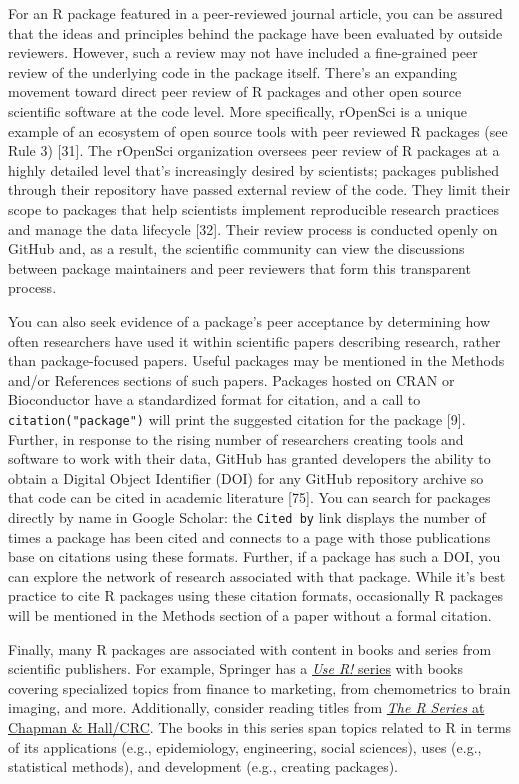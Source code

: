 \documentclass[10pt,letterpaper]{article}
\begin{document}
For an R package featured in a peer-reviewed journal article, you can be
assured that the ideas and principles behind the package have been
evaluated by outside reviewers. However, such a review may not have
included a fine-grained peer review of the underlying code in the
package itself. There's an expanding movement toward direct peer review
of R packages and other open source scientific software at the code
level. More specifically, rOpenSci is a unique example of an ecosystem
of open source tools with peer reviewed R packages (see Rule 3)
{[}31{]}. The rOpenSci organization oversees peer review of R packages
at a highly detailed level that's increasingly desired by scientists;
packages published through their repository have passed external review
of the code. They limit their scope to packages that help scientists
implement reproducible research practices and manage the data lifecycle
{[}32{]}. Their review process is conducted openly on GitHub and, as a
result, the scientific community can view the discussions between
package maintainers and peer reviewers that form this transparent
process.

You can also seek evidence of a package's peer acceptance by determining
how often researchers have used it within scientific papers describing
research, rather than package-focused papers. Useful packages may be
mentioned in the Methods and/or References sections of such papers.
Packages hosted on CRAN or Bioconductor have a standardized format for
citation, and a call to \texttt{citation("package")} will print the
suggested citation for the package {[}9{]}. Further, in response to the
rising number of researchers creating tools and software to work with
their data, GitHub has granted developers the ability to obtain a
Digital Object Identifier (DOI) for any GitHub repository archive so
that code can be cited in academic literature {[}75{]}. You can search
for packages directly by name in Google Scholar: the \texttt{Cited\ by}
link displays the number of times a package has been cited and connects
to a page with those publications base on citations using these formats.
Further, if a package has such a DOI, you can explore the network of
research associated with that package. While it's best practice to cite
R packages using these citation formats, occasionally R packages will be
mentioned in the Methods section of a paper without a formal citation.

Finally, many R packages are associated with content in books and series
from scientific publishers. For example, Springer has a
\href{https://www.springer.com/series/6991}{\emph{Use R!} series} with
books covering specialized topics from finance to marketing, from
chemometrics to brain imaging, and more. Additionally, consider reading
titles from
\href{https://www.routledge.com/Chapman--HallCRC-The-R-Series/book-series/CRCTHERSER}{\emph{The
R Series} at Chapman \& Hall/CRC}. The books in this series span topics
related to R in terms of its applications (e.g., epidemiology,
engineering, social sciences), uses (e.g., statistical methods), and
development (e.g., creating packages).
\end{document}
